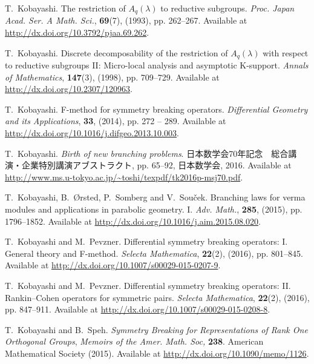 \begin{thebibliography}{CK{\O}P11}
T.~Kobayashi.
\newblock The restriction of ${A}_q \left( \lambda \right)$ to reductive
  subgroups.
\newblock \emph{Proc. Japan Acad. Ser. A Math. Sci.}, \textbf{69}(7), (1993),
  pp. 262--267.
Available at \url{http://dx.doi.org/10.3792/pjaa.69.262}.

T.~Kobayashi.
\newblock Discrete decomposability of the restriction of ${A}_q(\lambda)$ with
  respect to reductive subgroups {I}{I}: Micro-local analysis and asymptotic
  {K}-support.
\newblock \emph{Annals of Mathematics}, \textbf{147}(3), (1998), pp. 709--729.
Available at \url{http://dx.doi.org/10.2307/120963}.

T.~Kobayashi.
\newblock F-method for symmetry breaking operators.
\newblock \emph{Differential Geometry and its Applications}, \textbf{33},
  (2014), pp. 272 -- 289.
Available at \url{http://dx.doi.org/10.1016/j.difgeo.2013.10.003}.

T.~Kobayashi.
\newblock \emph{Birth of new branching problems}.
\newblock
  日本数学会70年記念　総合講演・企業特別講演アブストラクト, pp. 65--92,
  日本数学会, 2016.
Available at \url{http://www.ms.u-tokyo.ac.jp/~toshi/texpdf/tk2016p-msj70.pdf}.

T.~Kobayashi, B.~{\O}rsted, P.~Somberg and V.~Sou{\v{c}}ek.
\newblock Branching laws for verma modules and applications in parabolic
  geometry. {I}.
\newblock \emph{Adv. Math.}, \textbf{285}, (2015), pp. 1796--1852.
Available at \url{http://dx.doi.org/10.1016/j.aim.2015.08.020}.

T.~Kobayashi and M.~Pevzner.
\newblock Differential symmetry breaking operators: I. {G}eneral theory and
  {F}-method.
\newblock \emph{Selecta Mathematica}, \textbf{22}(2), (2016), pp. 801--845.
Available at \url{http://dx.doi.org/10.1007/s00029-015-0207-9}.

T.~Kobayashi and M.~Pevzner.
\newblock Differential symmetry breaking operators: {I}{I}. {R}ankin--{C}ohen
  operators for symmetric pairs.
\newblock \emph{Selecta Mathematica}, \textbf{22}(2), (2016), pp. 847--911.
Available at \url{http://dx.doi.org/10.1007/s00029-015-0208-8}.

T.~Kobayashi and B.~Speh.
\newblock \emph{Symmetry {B}reaking for {R}epresentations of {R}ank {O}ne
  {O}rthogonal {G}roups}, \emph{Memoirs of the Amer. Math. Soc,} \textbf{238}.
\newblock American Mathematical Society (2015).
Available at \url{http://dx.doi.org/10.1090/memo/1126}.

\end{thebibliography}
